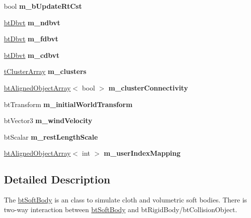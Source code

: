 \begin{DoxyCompactItemize}
bool {\bfseries m\+\_\+b\+Update\+Rt\+Cst}
\item 
\mbox{\label{classbtSoftBody_aff100eec6044f78bbc4f7e5ccf4619d3}} 
\hyperlink{structbtDbvt}{bt\+Dbvt} {\bfseries m\+\_\+ndbvt}
\item 
\mbox{\label{classbtSoftBody_ab4ca8f3ddef99e2068818d6fabbad321}} 
\hyperlink{structbtDbvt}{bt\+Dbvt} {\bfseries m\+\_\+fdbvt}
\item 
\mbox{\label{classbtSoftBody_a108b2be76b7647b2138d99e99b3bbdb0}} 
\hyperlink{structbtDbvt}{bt\+Dbvt} {\bfseries m\+\_\+cdbvt}
\item 
\mbox{\label{classbtSoftBody_a9579ec7fb7f43787cf4bc74eed279f48}} 
\hyperlink{classbtAlignedObjectArray}{t\+Cluster\+Array} {\bfseries m\+\_\+clusters}
\item 
\mbox{\label{classbtSoftBody_a2a7ce6797345d0b068b2d2bab2db0ff3}} 
\hyperlink{classbtAlignedObjectArray}{bt\+Aligned\+Object\+Array}$<$ bool $>$ {\bfseries m\+\_\+cluster\+Connectivity}
\item 
\mbox{\label{classbtSoftBody_a62f3be93755bd2e1f30bed79a9f72cac}} 
bt\+Transform {\bfseries m\+\_\+initial\+World\+Transform}
\item 
\mbox{\label{classbtSoftBody_ad02496af28d6bf408a736ee3e5f05c32}} 
bt\+Vector3 {\bfseries m\+\_\+wind\+Velocity}
\item 
\mbox{\label{classbtSoftBody_a6677ad95880f801daa33fd214489eefd}} 
bt\+Scalar {\bfseries m\+\_\+rest\+Length\+Scale}
\item 
\mbox{\label{classbtSoftBody_a3c48bbc3756ff3c21730154523a3b09d}} 
\hyperlink{classbtAlignedObjectArray}{bt\+Aligned\+Object\+Array}$<$ int $>$ {\bfseries m\+\_\+user\+Index\+Mapping}
\end{DoxyCompactItemize}


\subsection{Detailed Description}
The \hyperlink{classbtSoftBody}{bt\+Soft\+Body} is an class to simulate cloth and volumetric soft bodies. There is two-\/way interaction between \hyperlink{classbtSoftBody}{bt\+Soft\+Body} and bt\+Rigid\+Body/bt\+Collision\+Object. 

